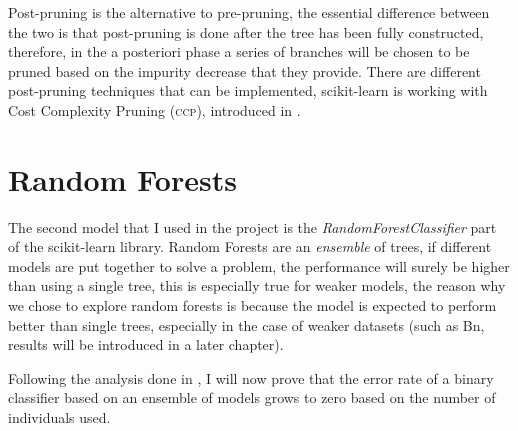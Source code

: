 \medskip

Post-pruning is the alternative to pre-pruning, the essential difference between the two is that
post-pruning is done after the tree has been fully constructed, therefore, in the a posteriori phase
a series of branches will be chosen to be pruned based on the impurity decrease that they provide.
There are different post-pruning techniques that can be implemented, scikit-learn is working with
Cost Complexity Pruning (\textsc{ccp}), introduced in \cite{breiman1984classification}.

\section{Random Forests}
\label{sec:rf}
The second model that I used in the project is the \emph{RandomForestClassifier} part of the scikit-learn
library. Random Forests are an \emph{ensemble} of trees, if different models are put together to solve a
problem, the performance will surely be higher than using a single tree, this is especially true for
weaker models, the reason why we chose to explore random forests is because the model is expected to
perform better than single trees, especially in the case of weaker datasets (such as Bn, results
will be introduced in a later chapter).

\medskip

Following the analysis done in \cite{ZhouZhi-Hua2021ML}, I will now prove that the error rate of a
binary classifier based on an ensemble of models grows to zero based on the number of individuals
used.

